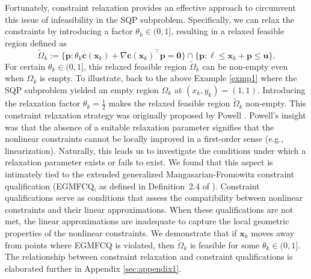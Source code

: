 \documentclass[aos]{imsart}
\numberwithin{equation}{section}
\theoremstyle{plain}
\begin{document}
Fortunately, constraint relaxation provides an effective approach to circumvent this issue of infeasibility in the SQP subproblem. Specifically, we can relax the constraints by introducing a factor $\theta_k \in (0,1]$, resulting in a relaxed feasible region defined as
\begin{equation*}
    \widetilde{\Omega}_k := \{\bm{p}: \theta_k \bm{c}(\bm{x}_{k})+\nabla \bm{c}(\bm{x}_k)^{\top}\bm{p}=\bm{0}\} \cap \{\bm{p}: \bm{\ell} \leq \bm{x}_k + \bm{p} \leq \bm{u}\}.
\end{equation*}
For certain $\theta_k \in (0,1]$, this relaxed feasible region $ \widetilde{\Omega}_k$ can be non-empty even when $\Omega_k$ is empty.
To illustrate, back to the above Example \ref{exmp1} where the SQP subproblem yielded an empty region $\Omega_k$ at $(x_k,y_k) = (1,1)$. Introducing the relaxation factor $\theta_k = \frac{1}{2}$ makes the relaxed feasible region $\widetilde{\Omega}_k$ non-empty. This constraint relaxation strategy was originally proposed by Powell \cite{powell2006fast}. Powell's insight was that the absence of a suitable relaxation parameter signifies that the nonlinear constraints cannot be locally improved in a first-order sense (e.g., linearization). Naturally, this leads us to investigate the conditions under which a relaxation parameter exists or fails to exist. We found that this aspect is intimately tied to the extended generalized Mangasarian-Fromowitz constraint qualification (EGMFCQ, as defined in Definition~2.4 of \cite{xu2015smoothing}). Constraint qualifications serve as conditions that assess the compatibility between nonlinear constraints and their linear approximations. When these qualifications are not met, the linear approximations are inadequate to capture the local geometric properties of the nonlinear constraints. We demonstrate that if $\bm{x}_k$ moves away from points where EGMFCQ is violated, then $\widetilde{\Omega}_k$ is feasible for some $\theta_k \in (0,1]$. The relationship between constraint relaxation and constraint qualifications is elaborated further in Appendix \ref{sec:appendix1}.
\end{document}
